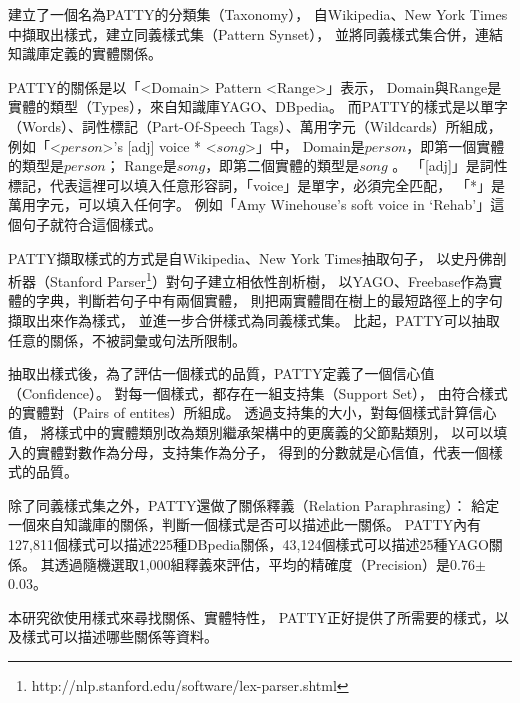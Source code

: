 \cite{patty,patty2012}建立了一個名為PATTY的分類集（Taxonomy），
自Wikipedia、New York Times中擷取出樣式，建立同義樣式集（Pattern Synset），
並將同義樣式集合併，連結知識庫定義的實體關係。

PATTY的關係是以「<Domain> Pattern <Range>」表示，
Domain與Range是實體的類型（Types），來自知識庫YAGO、DBpedia。
而PATTY的樣式是以單字（Words）、詞性標記（Part-Of-Speech Tags）、萬用字元（Wildcards）所組成，
例如「<$person$>'s [adj] voice * <$song$>」中，
Domain是$person$，即第一個實體的類型是$person$；
Range是$song$，即第二個實體的類型是$song$ 。
「[adj]」是詞性標記，代表這裡可以填入任意形容詞，「voice」是單字，必須完全匹配，
「*」是萬用字元，可以填入任何字。
例如「Amy Winehouse's soft voice in `Rehab'」這個句子就符合這個樣式。

PATTY擷取樣式的方式是自Wikipedia、New York Times抽取句子，
以史丹佛剖析器（Stanford Parser\footnote{http://nlp.stanford.edu/software/lex-parser.shtml}）對句子建立相依性剖析樹，
以YAGO、Freebase作為實體的字典，判斷若句子中有兩個實體，
則把兩實體間在樹上的最短路徑上的字句擷取出來作為樣式，
並進一步合併樣式為同義樣式集。
比起\cite{reverb}，PATTY可以抽取任意的關係，不被詞彙或句法所限制。

抽取出樣式後，為了評估一個樣式的品質，PATTY定義了一個信心值（Confidence）。
對每一個樣式，都存在一組支持集（Support Set），
由符合樣式的實體對（Pairs of entites）所組成。
透過支持集的大小，對每個樣式計算信心值，
將樣式中的實體類別改為類別繼承架構中的更廣義的父節點類別，
以可以填入的實體對數作為分母，支持集作為分子，
得到的分數就是心信值，代表一個樣式的品質。

除了同義樣式集之外，PATTY還做了關係釋義（Relation Paraphrasing）：
給定一個來自知識庫的關係，判斷一個樣式是否可以描述此一關係。
PATTY內有127,811個樣式可以描述225種DBpedia關係，43,124個樣式可以描述25種YAGO關係。
其透過隨機選取1,000組釋義來評估，平均的精確度（Precision）是0.76$\pm$0.03。

本研究欲使用樣式來尋找關係、實體特性，
PATTY正好提供了所需要的樣式，以及樣式可以描述哪些關係等資料。

